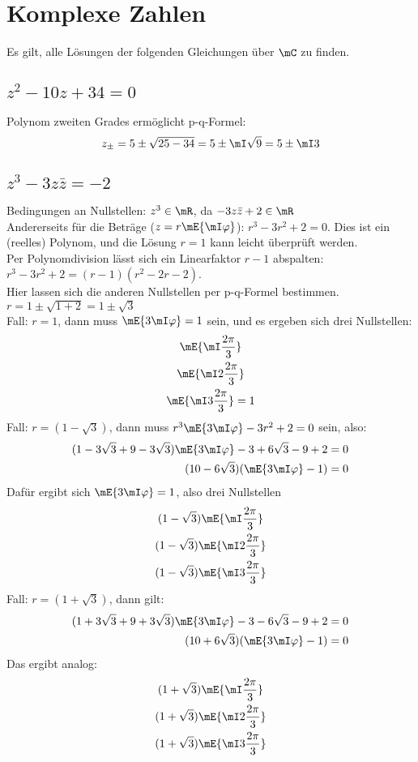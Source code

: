 \section{Komplexe Zahlen}
	Es gilt, alle Lösungen der folgenden Gleichungen über $\mC$ zu finden.
	\subsection{$z^2-10 z + 34= 0$}
	Polynom zweiten Grades ermöglicht p-q-Formel:
	\begin{equation}
		z_\pm = 5 \pm \sqrt{25-34} = 5 \pm \mI \sqrt{9} = 5 \pm \mI 3
	\end{equation}

	\subsection{$z^3-3 z\bar{z} = - 2$}
	Bedingungen an Nullstellen: $z^3 \in \mR$, da $-3z\bar{z}+2\in \mR$\\
	Andererseits für die Beträge ($z=r\mE{\mI\varphi}$): $r^3-3r^2+2=0$. Dies ist ein (reelles) Polynom, und die Lösung $r=1$ kann leicht überprüft werden.\\
	Per Polynomdivision lässt sich ein Linearfaktor $r-1$ abspalten: $r^3-3r^2+2 = (r-1)(r^2-2r-2)$.\\
	Hier lassen sich die anderen Nullstellen per p-q-Formel bestimmen. $r = 1 \pm \sqrt{1+2} = 1\pm\sqrt{3}$\\
	Fall: $r = 1$, dann muss $\mE{3\mI\varphi} = 1$ sein, und es ergeben sich drei Nullstellen:
	\begin{gather}
		\mE{\mI\frac{2\pi}{3}} \\
		\mE{\mI 2\frac{2\pi}{3}}\\
		\mE{\mI 3\frac{2\pi}{3}}=1
	\end{gather}
	Fall: $r = (1 - \sqrt{3})$, dann muss $r^3\mE{3\mI\varphi} - 3 r^2 + 2 = 0$ sein, also:
	\begin{align}
		(1 - 3\sqrt{3} + 9 - 3\sqrt{3})\mE{3\mI\varphi} - 3 + 6 \sqrt{3} - 9 +2 & = 0 \\
		(10-6\sqrt{3})(\mE{3\mI\varphi}-1) & = 0
	\end{align}
	Dafür ergibt sich $\mE{3\mI\varphi} = 1$, also drei Nullstellen
	\begin{gather}
		(1 - \sqrt{3})\mE{\mI\frac{2\pi}{3}} \\
		(1 - \sqrt{3})\mE{\mI 2\frac{2\pi}{3}}\\
		(1 - \sqrt{3})\mE{\mI 3\frac{2\pi}{3}}
	\end{gather}
	Fall: $r = (1 + \sqrt{3})$, dann gilt:
	\begin{align}
		(1 + 3\sqrt{3} + 9 + 3\sqrt{3})\mE{3\mI\varphi} - 3 - 6 \sqrt{3} - 9 +2 & = 0 \\
		(10+6\sqrt{3})(\mE{3\mI\varphi}-1) & = 0
	\end{align}
	Das ergibt analog:
	\begin{gather}
		(1 + \sqrt{3})\mE{\mI\frac{2\pi}{3}} \\
		(1 + \sqrt{3})\mE{\mI 2\frac{2\pi}{3}}\\
		(1 + \sqrt{3})\mE{\mI 3\frac{2\pi}{3}}
	\end{gather}

